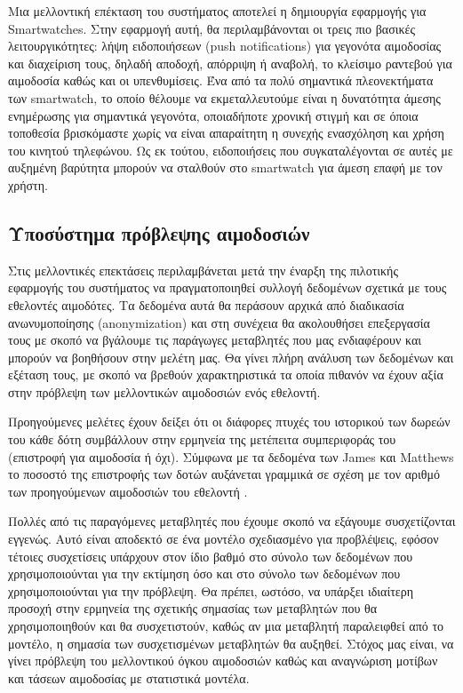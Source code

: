 	
	Μια μελλοντική επέκταση του συστήματος αποτελεί η δημιουργία εφαρμογής για Smartwatches. Στην εφαρμογή αυτή, θα περιλαμβάνονται οι τρεις πιο βασικές λειτουργικότητες: λήψη ειδοποιήσεων (push notifications) για γεγονότα αιμοδοσίας και διαχείριση τους, δηλαδή αποδοχή, απόρριψη ή αναβολή, το κλείσιμο ραντεβού για αιμοδοσία καθώς και οι υπενθυμίσεις. Ένα από τα πολύ σημαντικά πλεονεκτήματα των smartwatch, το οποίο θέλουμε να εκμεταλλευτούμε είναι η δυνατότητα άμεσης ενημέρωσης για σημαντικά γεγονότα, οποιαδήποτε χρονική στιγμή και σε όποια τοποθεσία βρισκόμαστε χωρίς να είναι απαραίτητη η συνεχής ενασχόληση και χρήση του κινητού τηλεφώνου. Ως εκ τούτου, ειδοποιήσεις που συγκαταλέγονται σε αυτές με αυξημένη βαρύτητα μπορούν να σταλθούν στο smartwatch για άμεση επαφή με τον χρήστη.
	
	
	
	
	\subsection{Υποσύστημα πρόβλεψης αιμοδοσιών}
		
		Στις μελλοντικές επεκτάσεις περιλαμβάνεται  μετά την έναρξη της πιλοτικής εφαρμογής του συστήματος να πραγματοποιηθεί συλλογή δεδομένων σχετικά με τους εθελοντές αιμοδότες. Τα δεδομένα αυτά θα περάσουν αρχικά από διαδικασία ανωνυμοποίησης (anonymization) και στη συνέχεια θα ακολουθήσει επεξεργασία τους με σκοπό να βγάλουμε τις παράγωγες μεταβλητές που μας ενδιαφέρουν και μπορούν να βοηθήσουν στην μελέτη μας. Θα γίνει πλήρη ανάλυση των δεδομένων και εξέταση τους, με σκοπό να βρεθούν χαρακτηριστικά τα οποία πιθανόν να έχουν αξία στην πρόβλεψη των μελλοντικών αιμοδοσιών ενός εθελοντή.
		
	Προηγούμενες μελέτες έχουν δείξει ότι οι διάφορες πτυχές του ιστορικού των δωρεών του κάθε δότη συμβάλλουν στην ερμηνεία της μετέπειτα συμπεριφοράς του (επιστροφή για αιμοδοσία ή όχι). Σύμφωνα με τα δεδομένα των James και Matthews το ποσοστό της επιστροφής των δοτών αυξάνεται γραμμικά σε σχέση με τον αριθμό των  προηγούμενων αιμοδοσιών του εθελοντή \cite{number_d}. 
		
		Πολλές από τις παραγόμενες μεταβλητές που έχουμε σκοπό να εξάγουμε συσχετίζονται εγγενώς. Αυτό είναι αποδεκτό σε ένα μοντέλο σχεδιασμένο για προβλέψεις, εφόσον τέτοιες συσχετίσεις υπάρχουν στον ίδιο βαθμό στο σύνολο των δεδομένων που χρησιμοποιούνται για την εκτίμηση όσο και στο σύνολο των δεδομένων που χρησιμοποιούνται για την πρόβλεψη. Θα πρέπει, ωστόσο, να υπάρξει ιδιαίτερη προσοχή στην ερμηνεία της σχετικής σημασίας των μεταβλητών που θα χρησιμοποιηθούν και θα συσχετιστούν, καθώς αν μια μεταβλητή παραλειφθεί από το μοντέλο, η σημασία των συσχετισμένων μεταβλητών θα αυξηθεί. Στόχος μας είναι, να γίνει πρόβλεψη του μελλοντικού όγκου αιμοδοσιών καθώς και αναγνώριση μοτίβων και τάσεων αιμοδοσίας με στατιστικά μοντέλα.
